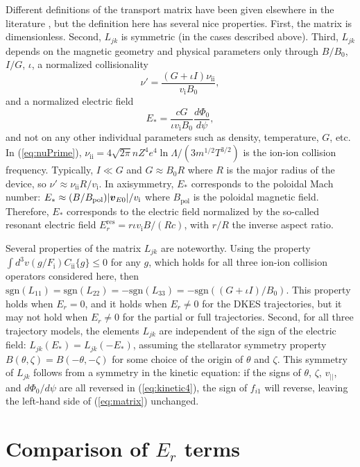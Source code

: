 \documentclass[12pt,superscriptaddress]{revtex4}
\newcommand{\vect}[1]{\mbox{\boldmath $#1$}}
\newcommand{\vEo}{\vect{v}_{E0}}
\newcommand{\vi}{v_{\mathrm{i}}}
\newcommand{\nuii}{\nu_{\mathrm{ii}}}
\newcommand{\sgn}{\mathrm{sgn}}
\newcommand{\Erres}{E_r^{\mathrm{res}}}
\newcommand{\Bpol}{B_{\mathrm{pol}}}
\begin{document}
Different definitions of the transport matrix have been given elsewhere in the literature \cite{Beidler},
but the definition here has several nice properties. First, the matrix is dimensionless. Second, $L_{jk}$ is symmetric (in the cases described above).
Third, $L_{jk}$ depends on the magnetic geometry and physical parameters only through
$B/B_0$, $I/G$, $\iota$, a normalized collisionality
\begin{equation}
\nu' = \frac{(G+\iota I)\nuii}{\vi B_0},
\label{eq:nuPrime}
\end{equation}
and a normalized electric field
\begin{equation}
E_* = \frac{c G}{\iota \vi B_0}\frac{d\Phi_0}{d\psi},
\label{eq:EStar}
\end{equation}
and not on any other individual parameters such as density, temperature, $G$, etc.
In (\ref{eq:nuPrime}), $\nuii = 4\sqrt{2\pi} n Z^4 e^4 \ln\Lambda/(3 m^{1/2} T^{3/2})$
is the ion-ion collision frequency.
Typically, $I \ll G$ and $G \approx B_0 R$ where $R$ is the major radius of the device,
so $\nu' \approx \nuii R / \vi$.
In axisymmetry, $E_*$ corresponds to the poloidal Mach number: $E_* \approx (B / \Bpol) | \vEo | / \vi$
where $\Bpol$ is the poloidal magnetic field.
Therefore, $E_*$ corresponds to the electric field normalized by the so-called resonant electric field \cite{Beidler}
$\Erres = r\iota \vi B/(R c)$, with $r/R$ the inverse aspect ratio.

Several properties of the matrix $L_{jk}$ are noteworthy. Using the property $\int d^3v (g/F_{\mathrm{i}}) C_{\mathrm{ii}}\{g\} \le 0$
for any $g$, which holds for all three ion-ion collision operators considered here,
then $\sgn(L_{11}) = \sgn(L_{22}) = -\sgn(L_{33}) = -\sgn((G+\iota I)/B_0)$.
This property holds when $E_r=0$, and it holds when $E_r \ne 0$ for the DKES trajectories, but it
may not hold when $E_r \ne 0$ for the partial or full trajectories.
Second, for all three trajectory models, the elements $L_{jk}$
are independent of the sign of the electric field: $L_{jk}(E_*) = L_{jk}(-E_*)$,
assuming the stellarator symmetry property $B(\theta,\zeta) = B(-\theta,-\zeta)$
for some choice of the origin of $\theta$ and $\zeta$.
This symmetry of $L_{jk}$ follows from a symmetry in the kinetic equation:
if the signs of 
$\theta$, $\zeta$, $v_{||}$, and $d\Phi_0/d\psi$ are all reversed
in (\ref{eq:kinetic4}), the sign of $f_{i1}$ will reverse,
leaving the left-hand side of (\ref{eq:matrix}) unchanged.


\section{Comparison of $E_r$ terms}
\label{sec:ErComparison}
\end{document}
